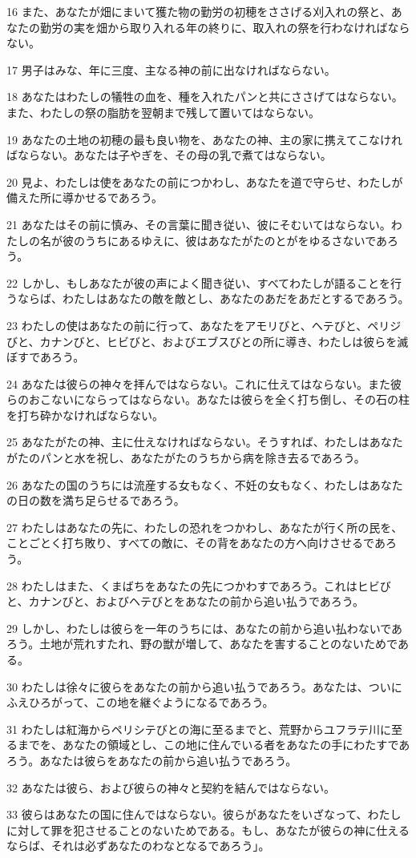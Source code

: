 \par 16 また、あなたが畑にまいて獲た物の勤労の初穂をささげる刈入れの祭と、あなたの勤労の実を畑から取り入れる年の終りに、取入れの祭を行わなければならない。
\par 17 男子はみな、年に三度、主なる神の前に出なければならない。
\par 18 あなたはわたしの犠牲の血を、種を入れたパンと共にささげてはならない。また、わたしの祭の脂肪を翌朝まで残して置いてはならない。
\par 19 あなたの土地の初穂の最も良い物を、あなたの神、主の家に携えてこなければならない。あなたは子やぎを、その母の乳で煮てはならない。
\par 20 見よ、わたしは使をあなたの前につかわし、あなたを道で守らせ、わたしが備えた所に導かせるであろう。
\par 21 あなたはその前に慎み、その言葉に聞き従い、彼にそむいてはならない。わたしの名が彼のうちにあるゆえに、彼はあなたがたのとがをゆるさないであろう。
\par 22 しかし、もしあなたが彼の声によく聞き従い、すべてわたしが語ることを行うならば、わたしはあなたの敵を敵とし、あなたのあだをあだとするであろう。
\par 23 わたしの使はあなたの前に行って、あなたをアモリびと、ヘテびと、ペリジびと、カナンびと、ヒビびと、およびエブスびとの所に導き、わたしは彼らを滅ぼすであろう。
\par 24 あなたは彼らの神々を拝んではならない。これに仕えてはならない。また彼らのおこないにならってはならない。あなたは彼らを全く打ち倒し、その石の柱を打ち砕かなければならない。
\par 25 あなたがたの神、主に仕えなければならない。そうすれば、わたしはあなたがたのパンと水を祝し、あなたがたのうちから病を除き去るであろう。
\par 26 あなたの国のうちには流産する女もなく、不妊の女もなく、わたしはあなたの日の数を満ち足らせるであろう。
\par 27 わたしはあなたの先に、わたしの恐れをつかわし、あなたが行く所の民を、ことごとく打ち敗り、すべての敵に、その背をあなたの方へ向けさせるであろう。
\par 28 わたしはまた、くまばちをあなたの先につかわすであろう。これはヒビびと、カナンびと、およびヘテびとをあなたの前から追い払うであろう。
\par 29 しかし、わたしは彼らを一年のうちには、あなたの前から追い払わないであろう。土地が荒れすたれ、野の獣が増して、あなたを害することのないためである。
\par 30 わたしは徐々に彼らをあなたの前から追い払うであろう。あなたは、ついにふえひろがって、この地を継ぐようになるであろう。
\par 31 わたしは紅海からペリシテびとの海に至るまでと、荒野からユフラテ川に至るまでを、あなたの領域とし、この地に住んでいる者をあなたの手にわたすであろう。あなたは彼らをあなたの前から追い払うであろう。
\par 32 あなたは彼ら、および彼らの神々と契約を結んではならない。
\par 33 彼らはあなたの国に住んではならない。彼らがあなたをいざなって、わたしに対して罪を犯させることのないためである。もし、あなたが彼らの神に仕えるならば、それは必ずあなたのわなとなるであろう」。

